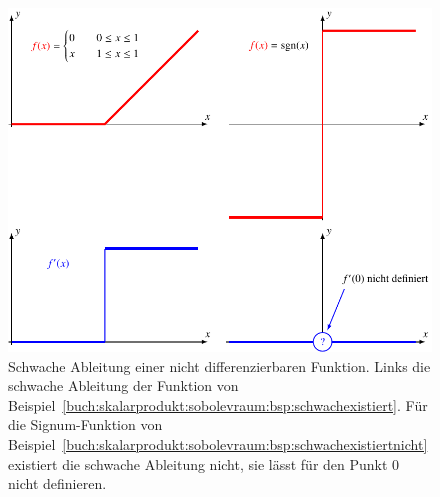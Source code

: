 %
%
%
\begin{figure}
\centering
\includegraphics{chapters/010-skalarprodukt/images/schwach.pdf}
\caption{Schwache Ableitung einer nicht differenzierbaren Funktion.
Links die schwache Ableitung der Funktion von
Beispiel~\ref{buch:skalarprodukt:sobolevraum:bsp:schwachexistiert}.
Für die Signum-Funktion von
Beispiel~\ref{buch:skalarprodukt:sobolevraum:bsp:schwachexistiertnicht}
existiert die schwache Ableitung nicht, sie lässt für den Punkt $0$
nicht definieren.
\label{buch:skalarprodukt:sobolevraum:fig:schwach}}
\end{figure}
